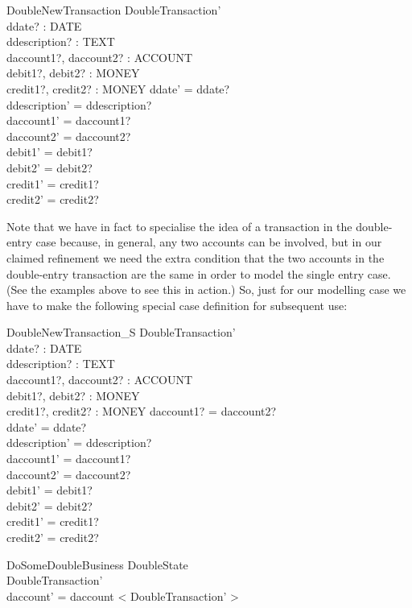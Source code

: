 \documentclass[11pt]{amsart}
\begin{document}
\begin{schema}{DoubleNewTransaction}
DoubleTransaction'\\
ddate? : DATE\\
ddescription? : TEXT\\
daccount1?, daccount2? : ACCOUNT\\ 
debit1?, debit2? : MONEY\\
credit1?, credit2? : MONEY
\where
ddate' = ddate?\\
ddescription' = ddescription?\\
daccount1' = daccount1?\\
daccount2' = daccount2?\\
debit1' = debit1?\\
debit2' = debit2?\\
credit1' = credit1?\\
credit2' = credit2?
\end{schema}

Note that we have in fact to specialise the idea of a transaction in the double-entry case because, in general, any two accounts can be involved, but in our claimed refinement we need the extra condition that the two accounts in the double-entry transaction are the same in order to model the single entry case. (See the examples above to see this in action.) So, just for our modelling case we have to make the following special case definition for subsequent use:

\begin{schema}{DoubleNewTransaction_S}
DoubleTransaction'\\
ddate? : DATE\\
ddescription? : TEXT\\
daccount1?, daccount2? : ACCOUNT\\ 
debit1?, debit2? : MONEY\\
credit1?, credit2? : MONEY
\where
daccount1? = daccount2?\\
ddate' = ddate?\\
ddescription' = ddescription?\\
daccount1' = daccount1?\\
daccount2' = daccount2?\\
debit1' = debit1?\\
debit2' = debit2?\\
credit1' = credit1?\\
credit2' = credit2?
\end{schema}


\begin{schema}{\Phi DoSomeDoubleBusiness}
\Delta DoubleState\\
DoubleTransaction'\\
\where
daccount' = daccount \cat < \theta DoubleTransaction' >
\end{schema}
\end{document}
